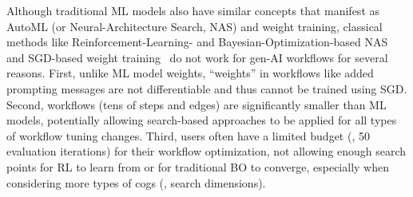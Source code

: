 Although traditional ML models also have similar concepts that manifest as AutoML (or Neural-Architecture Search, NAS) and weight training, classical %
methods like Reinforcement-Learning- %
and Bayesian-Optimization-based NAS~\cite{zoph17nas,falkner2018bohb, kandasamy2018nasbot,ENAS,hutter2019automated} and SGD-based weight training~\cite{lecun1998gradient} do not work for gen-AI workflows for several reasons.
First, unlike ML model weights, ``weights'' in workflows like added prompting messages are not differentiable and thus cannot be trained using SGD. 
Second, workflows (tens of steps and edges) are significantly smaller than ML models, potentially allowing search-based approaches to be applied for all types of workflow tuning changes.
Third, users often have a limited budget (\eg, 50 evaluation iterations) for their workflow optimization, not allowing enough search points for RL to learn from or for traditional BO to converge, especially when considering more types of cogs (\ie, search dimensions).

